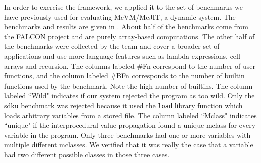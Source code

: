 \label{sec:results} 
In order to exercise the 
framework, we applied it to the set of benchmarks we have previously used for
evaluating McVM/McJIT\cite{CC2011}, a dynamic system.  The benchmarks and
results are given in .  About half of the benchmarks come
from the FALCON project\cite{falcon} and are purely array-based computations.
The other half of the benchmarks were collected by the \mclab team and cover a
broader set of applications and use more language features such as lambda
expressions, cell arrays and recursion.  The columns labeled \#Fn correspond to
the number of user functions, and the column labeled \#BFn corresponds to the
number of builtin functions used by the benchmark.  Note the high number of
builtins.  The column labeled ``Wild" indicates if our system rejected the
program as too wild.  Only the sdku benchmark was rejected because it used the
\texttt{load} library function which loads arbitrary variables from a stored
file. 
  The
column labeled ``Mclass" indicates ``unique" if the interprocedural
value propagation found a unique mclass for every variable in the
program.  Only three benchmarks had one or more variables with
multiple different mclasses.  We verified that it was really the case
that a variable had two different possible classes in those three
cases.

